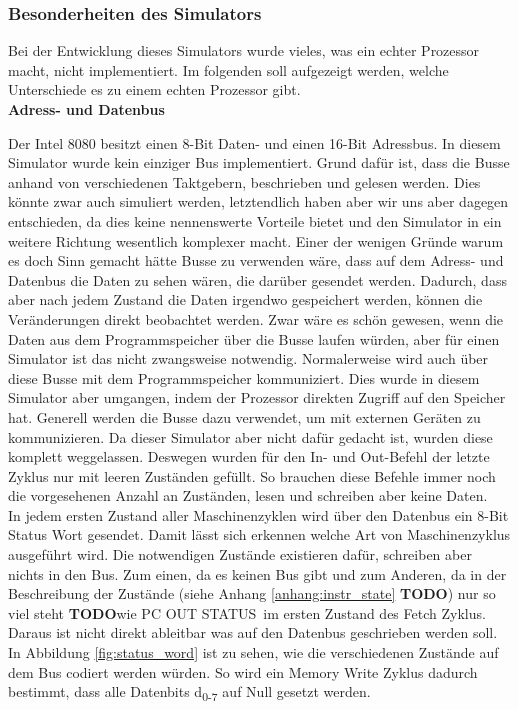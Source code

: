 \documentclass[12pt]{article}
\newcommand{\todo}{\textbf{TODO}}
\begin{document}
\subsubsection{Besonderheiten des Simulators}
Bei der Entwicklung dieses Simulators wurde vieles, was ein echter Prozessor macht, nicht implementiert. Im folgenden soll aufgezeigt werden, welche Unterschiede es zu einem echten Prozessor gibt.
\\

\noindent
\textbf{Adress- und Datenbus}

\noindent
Der Intel 8080 besitzt einen 8-Bit Daten- und einen 16-Bit Adressbus. 
In diesem Simulator wurde kein einziger Bus implementiert. Grund dafür ist, dass die Busse anhand von verschiedenen Taktgebern, beschrieben und gelesen werden. Dies könnte zwar auch simuliert werden, letztendlich haben aber wir uns aber dagegen entschieden, da dies keine nennenswerte Vorteile bietet und den Simulator in ein weitere Richtung wesentlich komplexer macht. Einer der wenigen Gründe warum es doch Sinn gemacht hätte Busse zu verwenden wäre, dass auf dem Adress- und Datenbus die Daten zu sehen wären, die darüber gesendet werden. Dadurch, dass aber nach jedem Zustand die Daten irgendwo gespeichert werden, können die Veränderungen direkt beobachtet werden. Zwar wäre es schön gewesen, wenn die Daten aus dem Programmspeicher über die Busse laufen würden, aber für einen Simulator ist das nicht zwangsweise notwendig. Normalerweise wird auch über diese Busse mit dem Programmspeicher kommuniziert. Dies wurde in diesem Simulator aber umgangen, indem der Prozessor direkten Zugriff auf den Speicher hat. Generell werden die Busse dazu verwendet, um mit externen Geräten zu kommunizieren. Da dieser Simulator aber nicht dafür gedacht ist, wurden diese komplett weggelassen. Deswegen wurden für den In- und Out-Befehl der letzte Zyklus nur mit leeren Zuständen gefüllt. So brauchen diese Befehle immer noch die vorgesehenen Anzahl an Zuständen, lesen und schreiben aber keine Daten.
\\

\noindent
In jedem ersten Zustand aller Maschinenzyklen wird über den Datenbus ein 8-Bit Status Wort gesendet. Damit lässt sich erkennen welche Art von Maschinenzyklus ausgeführt wird.
Die notwendigen Zustände existieren dafür, schreiben aber nichts in den Bus. Zum einen, da es keinen Bus gibt und zum Anderen, da in der Beschreibung der Zustände (siehe Anhang \ref{anhang:instr_state} \textbf{TODO}) nur so viel steht \todo wie \glqq PC OUT STATUS\grqq\ im ersten Zustand des Fetch Zyklus. Daraus ist nicht direkt ableitbar was auf den Datenbus geschrieben werden soll. In Abbildung \ref{fig:status_word} ist zu sehen, wie die verschiedenen Zustände auf dem Bus codiert werden würden. So wird ein Memory Write Zyklus dadurch bestimmt, dass alle Datenbits d\textsubscript{0-7} auf Null gesetzt werden.
\end{document}
